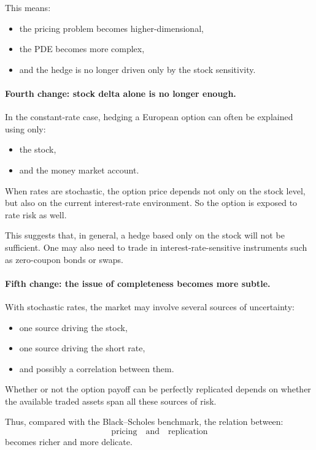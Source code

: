 \documentclass[11pt]{article}
\theoremstyle{plain}
\theoremstyle{definition}
\theoremstyle{remark}
\begin{document}
This means:
\begin{itemize}[leftmargin=1.4em]
    \item the pricing problem becomes higher-dimensional,
    \item the PDE becomes more complex,
    \item and the hedge is no longer driven only by the stock
    sensitivity.
\end{itemize}

\paragraph{Fourth change: stock delta alone is no longer enough.}
In the constant-rate case, hedging a European option can often be
explained using only:
\begin{itemize}[leftmargin=1.4em]
    \item the stock,
    \item and the money market account.
\end{itemize}

When rates are stochastic, the option price depends not only on the
stock level, but also on the current interest-rate environment.
So the option is exposed to rate risk as well.

This suggests that, in general, a hedge based only on the stock will not
be sufficient.
One may also need to trade in interest-rate-sensitive instruments such
as zero-coupon bonds or swaps.

\paragraph{Fifth change: the issue of completeness becomes more subtle.}
With stochastic rates, the market may involve several sources of
uncertainty:
\begin{itemize}[leftmargin=1.4em]
    \item one source driving the stock,
    \item one source driving the short rate,
    \item and possibly a correlation between them.
\end{itemize}

Whether or not the option payoff can be perfectly replicated depends on
whether the available traded assets span all these sources of risk.

Thus, compared with the Black--Scholes benchmark, the relation between:
\[
\text{pricing} \quad\text{and}\quad \text{replication}
\]
becomes richer and more delicate.
\end{document}
